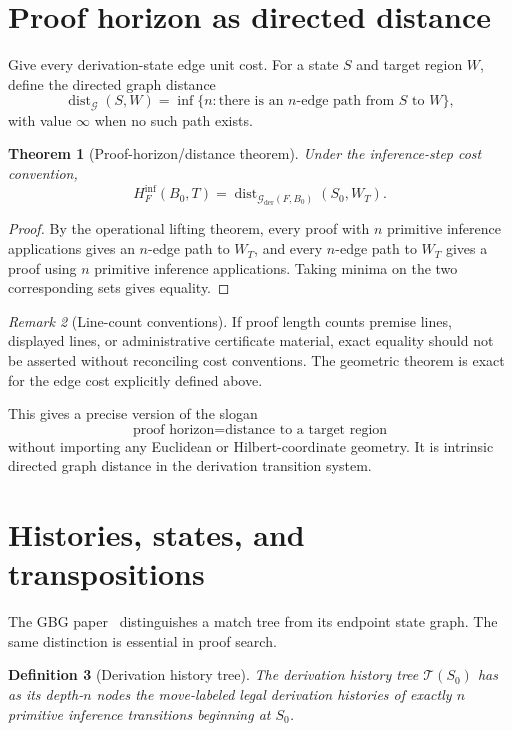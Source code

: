 \documentclass[11pt]{article}
\newtheorem{definition}{Definition}[section]
\newtheorem{theorem}[definition]{Theorem}
\theoremstyle{remark}
\newtheorem{remark}[definition]{Remark}
\newcommand{\dist}{\operatorname{dist}}
\newcommand{\calG}{\mathcal G}
\newcommand{\calT}{\mathcal T}
\begin{document}
\section{Proof horizon as directed distance}

Give every derivation-state edge unit cost. For a state $S$ and target region $W$, define the directed graph distance
\[
\dist_{\calG}(S,W)
=
\inf\{n:\text{there is an }n\text{-edge path from }S\text{ to }W\},
\]
with value $\infty$ when no such path exists.

\begin{theorem}[Proof-horizon/distance theorem]
Under the inference-step cost convention,
\[
\boxed{
H_F^{\mathrm{inf}}(B_0,T)
=
\dist_{\calG_{\mathrm{der}}(F,B_0)}(S_0,W_T).
}
\]
\end{theorem}

\begin{proof}
By the operational lifting theorem, every proof with $n$ primitive inference applications gives an $n$-edge path to $W_T$, and every $n$-edge path to $W_T$ gives a proof using $n$ primitive inference applications. Taking minima on the two corresponding sets gives equality.
\end{proof}

\begin{remark}[Line-count conventions]
If proof length counts premise lines, displayed lines, or administrative certificate material, exact equality should not be asserted without reconciling cost conventions. The geometric theorem is exact for the edge cost explicitly defined above.
\end{remark}

This gives a precise version of the slogan
\[
\boxed{\text{proof horizon}=\text{distance to a target region}}
\]
without importing any Euclidean or Hilbert-coordinate geometry. It is intrinsic directed graph distance in the derivation transition system.

\section{Histories, states, and transpositions}

The GBG paper~\cite{TennesonGBG} distinguishes a match tree from its endpoint state graph. The same distinction is essential in proof search.

\begin{definition}[Derivation history tree]
The derivation history tree $\calT(S_0)$ has as its depth-$n$ nodes the move-labeled legal derivation histories of exactly $n$ primitive inference transitions beginning at $S_0$.
\end{definition}
\end{document}
